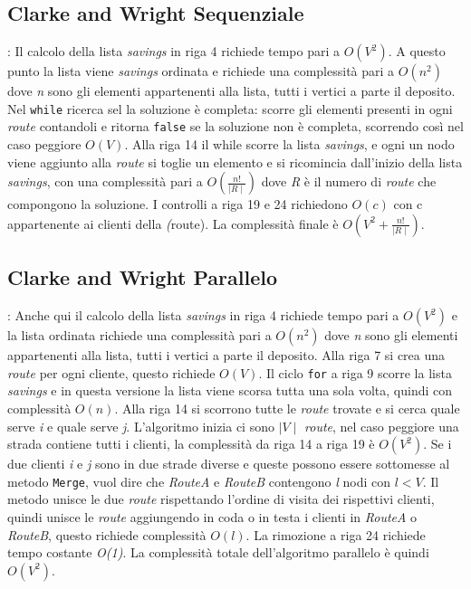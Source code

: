 \documentclass[]{article}
\begin{document}
\subsection{Clarke and Wright Sequenziale}: 
Il calcolo della lista \textit{savings} in riga 4 richiede tempo pari a \emph{$O(V^2)$}. A questo punto la lista viene \textit{savings} ordinata e richiede una complessità pari a \emph{$O(n^2)$} dove \emph{n} sono gli elementi appartenenti alla lista, tutti i vertici a parte il deposito. Nel \texttt{while} ricerca sel la soluzione è completa: scorre gli elementi presenti in ogni \emph{route} contandoli e ritorna \texttt{false} se la soluzione non è completa, scorrendo così nel caso peggiore  \emph{$O(V)$}. Alla riga 14 il while scorre la lista  \textit{savings}, e ogni un nodo viene aggiunto alla \emph{route} si toglie un elemento e si ricomincia dall'inizio della lista \textit{savings}, con una complessità pari a  \emph{$O(\frac{n!}{\mid R \mid })$} dove \emph{R} è il numero di \emph{route} che compongono la soluzione. I controlli a riga 19 e 24 richiedono \emph{$O(c)$} con c appartenente ai clienti della \emph(route). La complessità finale è  \emph{$ O(V^2 + \frac{n!}{\mid R \mid })$}.

\subsection{Clarke and Wright Parallelo}:
Anche qui il calcolo della lista \textit{savings} in riga 4 richiede tempo pari a \emph{$O(V^2)$} e la lista  ordinata richiede una complessità pari a \emph{$O(n^2)$} dove \emph{n} sono gli elementi appartenenti alla lista, tutti i vertici a parte il deposito. Alla riga 7 si crea una \emph{route} per ogni cliente, questo richiede \emph{$O(V)$}. Il ciclo \texttt{for} a riga 9 scorre la lista \textit{savings} e in questa versione la lista viene scorsa tutta una sola volta, quindi con complessità \emph{$O(n)$}. Alla riga 14 si scorrono tutte le \emph{route} trovate e si cerca quale serve \emph{i} e quale serve \emph{j}. L'algoritmo inizia ci sono \emph{$\mid V \mid$} \emph{route}, nel caso peggiore una strada contiene tutti i clienti, la complessità da riga 14 a riga 19 è \emph{$O(V^2)$}. Se i due clienti \emph{i} e \emph{j} sono in due strade diverse e queste possono essere sottomesse al metodo \texttt{Merge}, vuol dire che \textit{RouteA} e \textit{RouteB} contengono \emph{l} nodi con \emph{$l < V$}. Il metodo unisce le due \emph{route} rispettando l'ordine di visita dei rispettivi clienti, quindi unisce le \emph{route} aggiungendo in coda o in testa i clienti in \textit{RouteA} o \textit{RouteB}, questo richiede complessità \emph{$O(l)$}. La rimozione a riga 24 richiede tempo costante \emph{O(1)}. La complessità totale dell'algoritmo parallelo è quindi \emph{$O(V^2)$}.	
\end{document}
